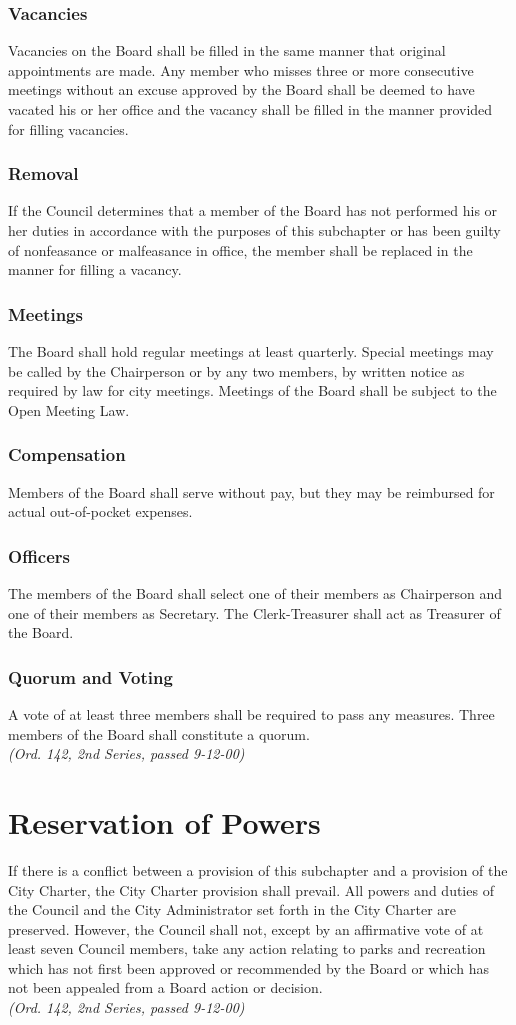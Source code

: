 \subsubsection{Vacancies}
Vacancies on the Board shall be filled in the same manner that original appointments are made. Any member who misses three or more consecutive meetings without an excuse approved by the Board shall be deemed to have vacated his or her office and the vacancy shall be filled in the manner provided for filling vacancies.
\subsubsection{Removal}
If the Council determines that a member of the Board has not performed his or her duties in accordance with the purposes of this subchapter or has been guilty of nonfeasance or malfeasance in office, the member shall be replaced in the manner for filling a vacancy.
\subsubsection{Meetings}
The Board shall hold regular meetings at least quarterly.  Special meetings may be called by the Chairperson or by any two members, by written notice as required by law for city meetings.  Meetings of the Board shall be subject to the Open Meeting Law.
\subsubsection{Compensation}
Members of the Board shall serve without pay, but they may be reimbursed for actual out-of-pocket expenses.
\subsubsection{Officers}
The members of the Board shall select one of their members as Chairperson and one of their members as Secretary.  The Clerk-Treasurer shall act as Treasurer of the Board.
\subsubsection{Quorum and Voting}
A vote of at least three members shall be required to pass any measures.  Three members of the Board shall constitute a quorum.\\
\emph{(Ord. 142, 2nd Series, passed 9-12-00)}
\section{Reservation of Powers}
If there is a conflict between a provision of this subchapter and a provision of the City Charter, the City Charter provision shall prevail.  All powers and duties of the Council and the City Administrator set forth in the City Charter are preserved.  However, the Council shall not, except by an affirmative vote of at least seven Council members, take any action relating to parks and recreation which has not first been approved or recommended by the Board or which has not been appealed from a Board action or decision.\\
\emph{(Ord. 142, 2nd Series, passed 9-12-00)}
